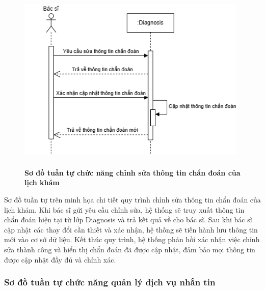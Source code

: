 \begin{figure}[H]
	\centering
	\includegraphics[width=11cm,height=9cm]{Images/sequence/diagnosis/update.drawio.png}
	\caption[Sơ đồ tuần tự chức năng chỉnh sửa thông tin chẩn đoán của lịch khám]{\bfseries \fontsize{12pt}{0pt}
		\selectfont Sơ đồ tuần tự chức năng chỉnh sửa thông tin chẩn đoán của lịch khám}
	\label{sequence_update} %
\end{figure}
Sơ đồ tuần tự trên minh họa chi tiết quy trình chỉnh sửa thông tin chẩn đoán của lịch khám. Khi bác sĩ gửi yêu cầu chỉnh sửa, hệ thống sẽ truy xuất thông tin chẩn đoán hiện tại từ lớp Diagnosis và trả kết quả về cho bác sĩ.
Sau khi bác sĩ cập nhật các thay đổi cần thiết và xác nhận, hệ thống sẽ tiến hành lưu thông tin mới vào cơ sở dữ liệu.
Kết thúc quy trình, hệ thống phản hồi xác nhận việc chỉnh sửa thành công và hiển thị chẩn đoán đã được cập nhật, đảm bảo mọi thông tin được cập nhật đầy đủ và chính xác.

\subsubsection{Sơ đồ tuần tự chức năng quản lý dịch vụ nhắn tin}

